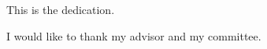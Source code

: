 %
%
%
%

\begin{dedication}
  This is the dedication.
\end{dedication}

\begin{acknowledgments}
  I would like to thank my advisor and my committee.
\end{acknowledgments}


\tableofcontents

\listoftables

